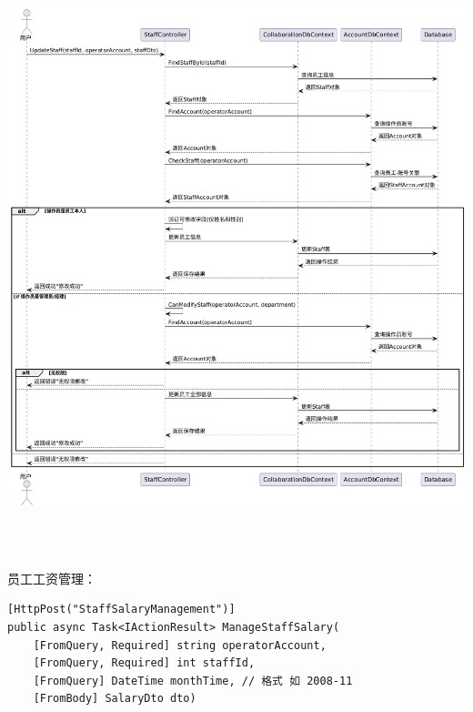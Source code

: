 \documentclass[]{article}
\begin{document}
\includegraphics[width=6.20625in,height=6.7625in]{media/media/image17.png}

员工工资管理：
\begin{verbatim}
[HttpPost("StaffSalaryManagement")]
public async Task<IActionResult> ManageStaffSalary(
    [FromQuery, Required] string operatorAccount,
    [FromQuery, Required] int staffId,
    [FromQuery] DateTime monthTime, // 格式 如 2008-11
    [FromBody] SalaryDto dto)
\end{verbatim}
\end{document}
